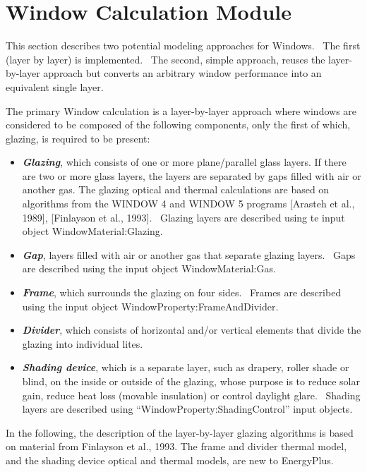 \section{Window Calculation Module}\label{window-calculation-module}

This section describes two potential modeling approaches for Windows.~ The first (layer by layer) is implemented.~ The second, simple approach, reuses the layer-by-layer approach but converts an arbitrary window performance into an equivalent single layer.

The primary Window calculation is a layer-by-layer approach where windows are considered to be composed of the following components, only the first of which, glazing, is required to be present:

\begin{itemize}
\item
  \textbf{\emph{Glazing}}, which consists of one or more plane/parallel glass layers. If there are two or more glass layers, the layers are separated by gaps filled with air or another gas. The glazing optical and thermal calculations are based on algorithms from the WINDOW 4 and WINDOW 5 programs {[}Arasteh et al., 1989{]}, {[}Finlayson et al., 1993{]}.~ Glazing layers are described using te input object WindowMaterial:Glazing.
\item
  \textbf{\emph{Gap}}, layers filled with air or another gas that separate glazing layers.~ Gaps are described using the input object WindowMaterial:Gas.
\item
  \textbf{\emph{Frame}}, which surrounds the glazing on four sides.~ Frames are described using the input object WindowProperty:FrameAndDivider.
\item
  \textbf{\emph{Divider}}, which consists of horizontal and/or vertical elements that divide the glazing into individual lites.
\item
  \textbf{\emph{Shading device}}, which is a separate layer, such as drapery, roller shade or blind, on the inside or outside of the glazing, whose purpose is to reduce solar gain, reduce heat loss (movable insulation) or control daylight glare.~ Shading layers are described using ``WindowProperty:ShadingControl'' input objects.
\end{itemize}

In the following, the description of the layer-by-layer glazing algorithms is based on material from Finlayson et al., 1993. The frame and divider thermal model, and the shading device optical and thermal models, are new to EnergyPlus.

